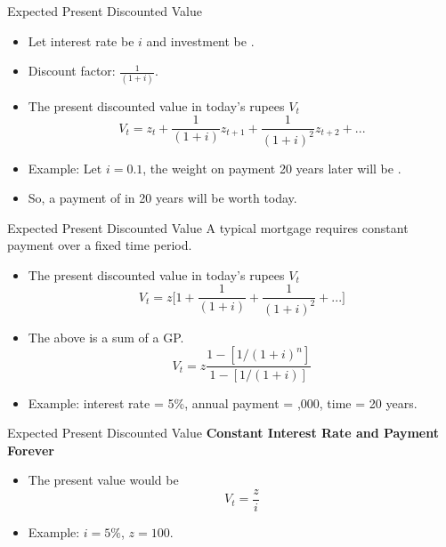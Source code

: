 \documentclass[shownotes,11pt, aspectratio=169]{beamer}
\begin{document}
\begin{frame}{Expected Present Discounted Value}
\begin{itemize}
\item Let interest rate be $i$ and investment be .
\item Discount factor: $\frac{1}{(1 + i)}$.
\pause
\item The present discounted value in today's rupees $V_t$
   \[ V_t = z_t + \frac{1}{(1 + i)}z_{t+1} + \frac{1}{(1 + i)^2}z_{t+2} + ... \]
\pause
\item Example: Let $i = 0.1$, the weight on payment 20 years later will be . 
\item So, a payment of  in 20 years will be worth  today.
\end{itemize}
\end{frame}

\begin{frame}{Expected Present Discounted Value}
A typical mortgage requires constant payment over a fixed time period.
\begin{itemize}
\item The present discounted value in today's rupees $V_t$
   \begin{equation*}
    V_t = z\bigg[ 1 + \frac{1}{(1 + i)} + \frac{1}{(1 + i)^2} + ... \bigg]
    \end{equation*}
\pause
\item The above is a sum of a GP.
     \begin{equation*}
     V_t = z\frac{1 - [1/(1 + i)^n]}{1 - [1/(1 + i)]}
     \end{equation*}
\item Example: interest rate = 5\%, annual payment = ,000, time = 20 years.
\end{itemize}
\end{frame}

\begin{frame}{Expected Present Discounted Value}
\textbf{Constant Interest Rate and Payment Forever}
\begin{itemize}
\item The present value would be
     \[ V_t = \frac{z}{i} \]
\item Example: $i = 5\%$, $z = 100$.
\end{itemize}
\end{frame}
\end{document}
